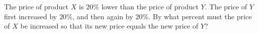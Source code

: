 The price of product $X$ is $20\%$ lower than the price of product $Y$. The price of $Y$ first increased by $20\%$, and then again by $20\%$. By what percent must the price of $X$ be increased so that its new price equals the new price of $Y$?
